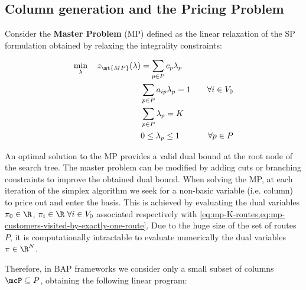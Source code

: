 \subsection{Column generation and the Pricing Problem}
\label{sec:column-generation-and-pricing-problem}

Consider the \textbf{Master Problem} (MP) defined
as the linear relaxation of the SP formulation obtained by relaxing the integrality constraints:

\begin{align}
	\min_{\lambda} \quad z_\mt{MP}(\lambda) & = \sum_{p \in P}  c_p \lambda_p \label{eq:mp-obj-func}                                                                                                                             \\
	                                        & \sum_{p \in P}  a_{ip} \lambda_p = 1                   & \quad \forall i \in V_0                                              \label{eq:mp-customers-visited-by-exactly-one-route} \\
	                                        & \sum_{p \in P} \lambda_{p} = K\label{eq:mp-K-routes}                                                                                                                               \\
	                                        & 0 \le \lambda_p \le 1                                  & \quad \forall p \in P \label{eq:mp-lambda-mip-var-bounds}
\end{align}


An optimal solution to the MP provides a valid dual bound at the root node of the search tree.
The master problem can be modified by adding cuts or branching constraints to improve the obtained dual bound.
When solving the MP,
at each iteration of the simplex algorithm \parencite{dantzig1955} we seek for a non-basic variable (i.e. column)
to price out and enter the basis.
This is achieved by evaluating the dual variables $\pi_0 \in \R$, $\pi_{i} \in \R \ \forall i \in V_0$
associated respectively with \cref{eq:mp-K-routes,eq:mp-customers-visited-by-exactly-one-route}.
Due to the huge size of the set of routes $P$,
it is computationally intractable to evaluate numerically the dual variables $\pi \in \R^{N}$.

\medskip

Therefore, in BAP frameworks we consider only a small subset of columns $\mcP \subseteq P$,
obtaining the following linear program:

